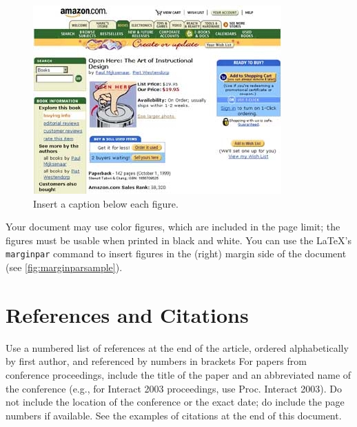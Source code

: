 \documentclass{chi-ext}
\begin{document}
\begin{figure}
  \centering
  \includegraphics[width=\linewidth]{sample.jpg}
  \caption{Insert a caption below each figure.}
  \label{fig:sample}
\end{figure}

Your document may use color figures, which are included in the page limit; the figures must be usable when printed in black and white.
You can use the \LaTeX's \texttt{marginpar} command to insert figures in the (right) margin side of the document (see \autoref{fig:marginparsample}).


\section{References and Citations}
Use a numbered list of references at the end of the article, ordered alphabetically by first author, and referenced by numbers in brackets \cite{Anderson92,Klemmer02,Mather00,Zellweger01}
For papers from conference proceedings, include the title of the paper and an abbreviated name of the conference (e.g., for Interact 2003 proceedings, use Proc. Interact 2003).
Do not include the location of the conference or the exact date; do include the page numbers if available.
See the examples of citations at the end of this document.
\end{document}
